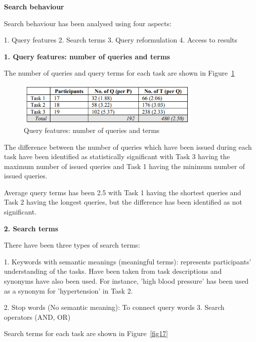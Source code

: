 \documentclass[]{article}
\begin{document}
\textbf{Search behaviour}

Search behaviour has been analysed using four aspects:

1. Query features
2. Search terms
3. Query reformulation
4. Access to results

\textbf{1. Query features: number of queries and terms}

The number of queries and query terms for each task are shown in Figure~\ref{fig16}

\begin{figure}[b!]
	\includegraphics[width=0.8\textwidth]{Capture16.png}
	\caption{Query features: number of queries and terms \label{fig16}}
\end{figure}

The difference between the number of queries which have been issued during each task have been identified as statistically significant with Task 3 having the maximum number of issued queries and Task 1 having the minimum number of issued queries.

Average query terms has been 2.5 with Task 1 having the shortest queries and Task 2 having the longest queries, but the difference has been identified as not significant. 

\textbf{2. Search terms}

There have been three types of search terms:

1. Keywords with semantic meanings (meaningful terms): represents participants' understanding of the tasks. Have been taken from task descriptions and synonyms have also been used. For instance, 'high blood pressure' has been used as a synonym for 'hypertension' in Task 2.

2. Stop words (No semantic meaning): To connect query words
3. Search operators (AND, OR)

Search terms for each task are shown in Figure~\ref{fig17}
\end{document}
